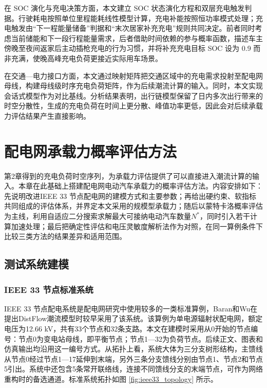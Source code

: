 \documentclass[10pt,a4paper]{article}
\numberwithin{equation}{section}
\numberwithin{table}{section}
\numberwithin{figure}{section}
\begin{document}
    在 SOC 演化与充电决策方面，本文建立 SOC 状态演化方程和双层充电触发判据。行驶耗电按照单位里程能耗线性模型计算，充电补能按照恒功率模式处理；充电触发由“下一程能量储备”判据和“末次居家补充充电”规则共同决定。前者同时考虑当前储能和下一段行程能量需求，后者借助时间依赖的参与概率函数，描述车主傍晚至夜间返家后主动插枪充电的行为习惯，并将补充充电目标 SOC 设为 0.9 而非充满，使晚高峰充电负荷更接近实际用车场景。

    在交通—电力接口方面，本文通过映射矩阵把交通区域中的充电需求投射至配电网母线，构建母线级时序充电负荷矩阵，作为后续潮流计算的输入。同时，本文实现会话式模型作为对比基线。分析结果表明，出行链模型保留了日内多次出行带来的时空分散性，生成的充电负荷在时间上更分散、峰值功率更低，因此会对后续承载力评估结果产生直接影响。

    \clearpage
    \section{配电网承载力概率评估方法}

    第2章得到的充电负荷时空序列，为承载力评估提供了可以直接进入潮流计算的输入。本章在此基础上搭建配电网电动汽车承载力的概率评估方法。内容安排如下：先说明改进IEEE 33 节点配电网的建模方式和主要参数；再给出硬约束、软指标共同组成的评估体系，并界定本文采用的规模型承载力；随后以蒙特卡洛概率评估为主线，利用自适应二分搜索求解最大可接纳电动汽车数量$N^*$，同时引入若干计算加速处理；最后把确定性评估和电压灵敏度解析法作为对照，在同一算例条件下比较三类方法的结果差异和适用范围。

    \subsection{测试系统建模}

    \subsubsection{IEEE 33 节点标准系统}

    IEEE 33 节点配电系统是配电网研究中使用较多的一类标准算例，Baran和Wu\supercite{ref22}在提出DistFlow潮流模型时较早采用了该系统。该算例为单电源辐射状配电网，额定电压为12.66 kV，共有33个节点和32条支路。本文在建模时采用从0开始的节点编号：节点0为变电站母线，即平衡节点；节点1—32为负荷节点。后续正文、图表和仿真输出均沿用这一编号方式。从拓扑上看，系统大体为三分支树形结构，主馈线从节点0经过节点1—17延伸到末端，另外三条分支馈线分别由节点1、节点2和节点5引出。系统中还包含5条常开联络线，连接不同馈线分支的末端节点，可作为网络重构时的备选通道。标准系统拓扑如图 \ref{fig:ieee33_topology} 所示。
\end{document}
